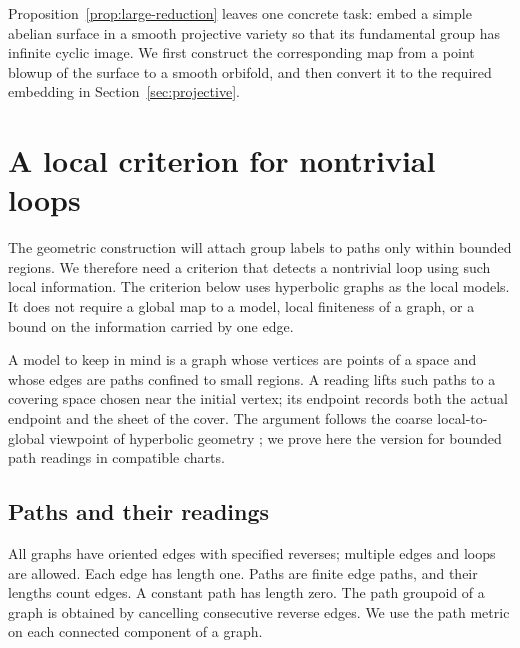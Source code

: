 \documentclass[11pt,reqno]{amsart}
\numberwithin{equation}{section}
\theoremstyle{definition}
\theoremstyle{remark}
\begin{document}
Proposition~\ref{prop:large-reduction} leaves one concrete task: embed a
simple abelian surface in a smooth projective variety so that its
fundamental group has infinite cyclic image.  We first construct the
corresponding map from a point blowup of the surface to a smooth
orbifold, and then convert it to the required embedding in
Section~\ref{sec:projective}.

\section{A local criterion for nontrivial loops}\label{sec:paths}

The geometric construction will attach group labels to paths only within
bounded regions.  We therefore need a criterion that detects a nontrivial
loop using such local information.  The criterion below uses hyperbolic
graphs as the local models.  It does not require a global map to a model,
local finiteness of a graph, or a bound on the information carried by one
edge.

A model to keep in mind is a graph whose vertices are points of a space
and whose edges are paths confined to small regions.  A reading lifts
such paths to a covering space chosen near the initial vertex; its
endpoint records both the actual endpoint and the sheet of the cover.
The argument follows the coarse local-to-global viewpoint of hyperbolic
geometry \cite{Gromov1987}; we prove here the version for bounded path
readings in compatible charts.

\subsection{Paths and their readings}

All graphs have oriented edges with specified reverses; multiple edges and
loops are allowed.  Each edge has length one.  Paths are finite edge paths,
and their lengths count edges.  A constant path has length zero.  The path
groupoid of a graph is obtained by cancelling consecutive reverse edges.
We use the path metric on each connected component of a graph.
\end{document}
